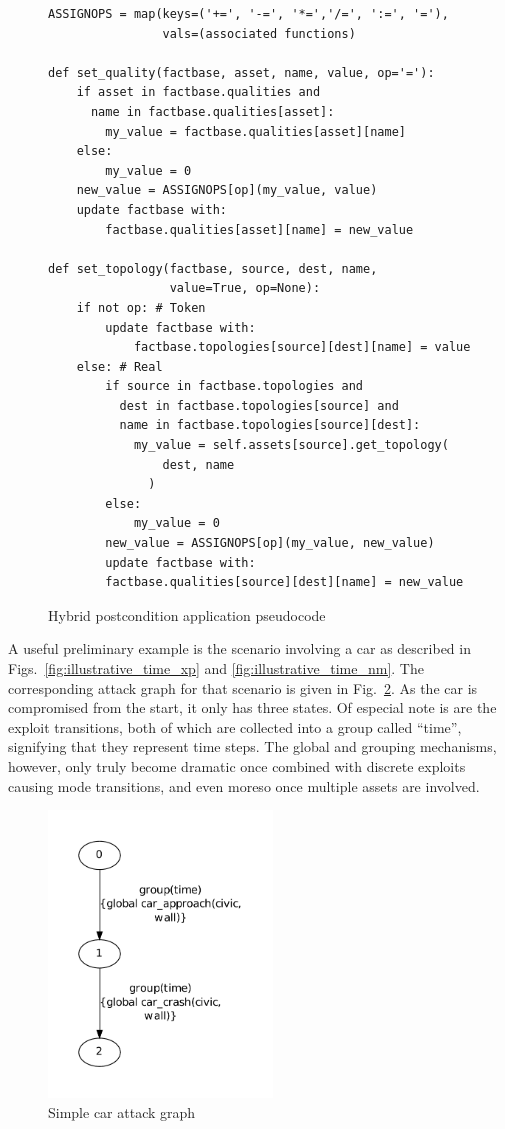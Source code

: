 \begin{figure}
\begin{lstlisting}
ASSIGNOPS = map(keys=('+=', '-=', '*=','/=', ':=', '='),
                vals=(associated functions)

def set_quality(factbase, asset, name, value, op='='):
    if asset in factbase.qualities and
      name in factbase.qualities[asset]:
        my_value = factbase.qualities[asset][name]
    else:
        my_value = 0
    new_value = ASSIGNOPS[op](my_value, value)
    update factbase with:
        factbase.qualities[asset][name] = new_value

def set_topology(factbase, source, dest, name, 
                 value=True, op=None):
    if not op: # Token
        update factbase with:
            factbase.topologies[source][dest][name] = value
    else: # Real
        if source in factbase.topologies and
          dest in factbase.topologies[source] and
          name in factbase.topologies[source][dest]:
            my_value = self.assets[source].get_topology(
                dest, name
              )
        else:
            my_value = 0
        new_value = ASSIGNOPS[op](my_value, new_value)
        update factbase with:
        factbase.qualities[source][dest][name] = new_value
\end{lstlisting}
\caption{Hybrid postcondition application pseudocode}
\label{fig:hybrid-postcondition}
\end{figure}
A useful preliminary example is the scenario involving a car as described in
Figs.~\ref{fig:illustrative_time_xp} and \ref{fig:illustrative_time_nm}. The
corresponding attack graph for that scenario is given in 
Fig.~\ref{fig:fullbunny_simple_ag}. As the car is compromised from the start,
it only has three states. Of especial note is are the exploit transitions,
both of which are collected into a group called ``time'', signifying that
they represent time steps. The global and grouping mechanisms, however, only 
truly become dramatic once combined with discrete exploits causing mode %
transitions, and even moreso once multiple assets are involved.
\label{sec:car}

\begin{figure}
\includegraphics[height=3in]{ag_car/simple/full_bunny_1_ag_5}
\caption{Simple car attack graph}
\label{fig:fullbunny_simple_ag}
\end{figure}

